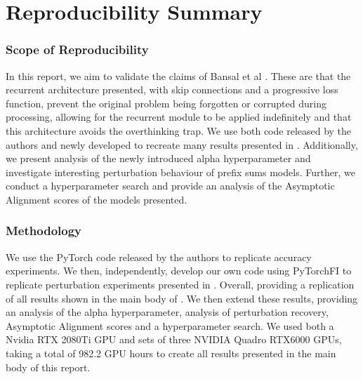 \section*{\centering Reproducibility Summary}


\subsubsection*{Scope of Reproducibility}


In this report, we aim to validate the claims of Bansal et al \cite{bansal2022endtoend}. These are that the recurrent architecture presented, with skip connections and a progressive loss function, prevent the original problem being forgotten or corrupted during processing, allowing for the recurrent module to be applied indefinitely and that this architecture avoids the overthinking trap. We use both code released by the authors and newly developed to recreate many results presented in \cite{bansal2022endtoend}.
Additionally, we present analysis of the newly introduced alpha hyperparameter and investigate interesting perturbation behaviour of prefix sums models. Further, we conduct a hyperparameter search and provide an analysis of the Asymptotic Alignment scores \cite{anil2022path} of the models presented.

\subsubsection*{Methodology}

We use the PyTorch code released by the authors to replicate accuracy experiments. We then, independently, develop our own code using PyTorchFI \cite{PytorchFIMahmoudAggarwalDSML20} to replicate perturbation experiments presented in \cite{bansal2022endtoend}. Overall, providing a replication of all results shown in the main body of \cite{bansal2022endtoend}. We then extend these results, providing an analysis of the alpha hyperparameter, analysis of perturbation recovery, Asymptotic Alignment scores \cite{anil2022path} and a hyperparameter search. We used both a Nvidia RTX 2080Ti GPU and sets of three NVIDIA Quadro RTX6000 GPUs, taking a total of 982.2 GPU hours to create all results presented in the main body of this report.

